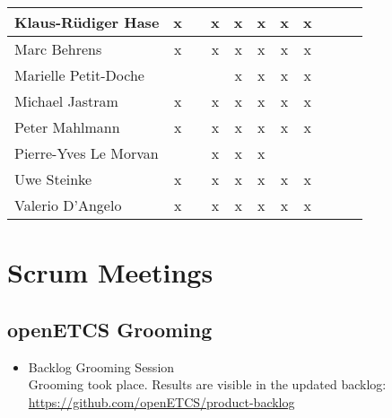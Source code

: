 \documentclass[a4paper, 11pt]{article}
\begin{document}
\begin{tabular}{|l|c|c|c|c||c|c|c||c|c|c|}
Klaus-R\"udiger Hase & x &   & x & x & x & x & x \\\hline
Marc Behrens         & x &   & x & x & x & x & x \\\hline
Marielle Petit-Doche &   &   &   & x & x & x & x \\\hline
Michael Jastram      & x &   & x & x & x & x & x  \\\hline
Peter Mahlmann       & x &   & x & x & x & x & x \\\hline
Pierre-Yves Le Morvan &   &   & x & x & x &   &   \\\hline
Uwe Steinke          & x &   & x & x & x & x & x \\\hline
Valerio D'Angelo     & x &   & x & x  & x & x & x \\\hline
\end{tabular}


\section{Scrum Meetings}

\subsection{openETCS Grooming}
\begin{itemize}
\item Backlog Grooming Session\\
Grooming took place. Results are visible in the updated backlog:\\
\url{https://github.com/openETCS/product-backlog}

\end{itemize}
\end{document}
